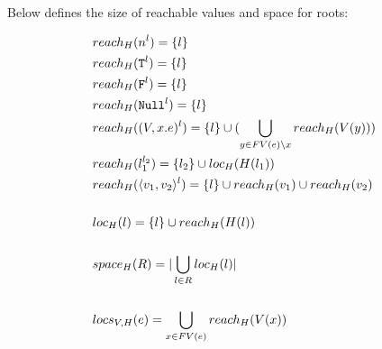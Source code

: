 \documentclass[11pt]{article}
\newcommand{\irl}[1]{\mathtt{#1}}
\begin{document}
Below defines the size of reachable values and space for roots:

\begin{align*}
  &reach_{H}(n^l) = \{l\}\\
  &reach_{H}(\irl{T}^l) = \{l\}\\
  &reach_{H}(\irl{F}^l) = \{l\}\\
  &reach_{H}(\irl{Null}^l) = \{l\}\\
  &reach_{H}((V, x.e)^l) = \{l\} \cup (\bigcup\limits_{y \in FV(e) \setminus x} reach_H(V(y))) \\
  &reach_{H}(l_1^{l_2}) = \{l_2\} \cup loc_{H}(H(l_1))\\
  &reach_{H}(\pairexcst{v_1}{v_2}^l) = \{l\} \cup reach_{H}(v_1) \cup reach_{H}(v_2)\\\\
  &loc_{H}(l) = \{l\} \cup reach_{H}(H(l))\\\\
  &space_{H}(R) = |\bigcup\limits_{l \in R} loc_{H}(l)|\\\\
  &locs_{V,H}(e) = \bigcup\limits_{x \in FV(e)} reach_H(V(x))
\end{align*}
\end{document}
